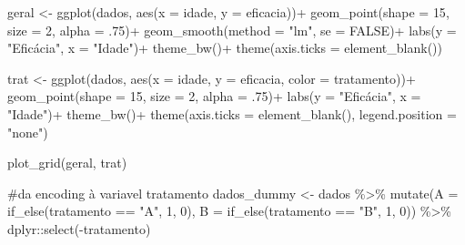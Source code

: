 \documentclass[
  letterpaper,
  DIV=11,
  numbers=noendperiod]{scrartcl}
\newenvironment{Shaded}{\begin{snugshade}}{\end{snugshade}}
\newcommand{\AttributeTok}[1]{\textcolor[rgb]{0.40,0.45,0.13}{#1}}
\newcommand{\CommentTok}[1]{\textcolor[rgb]{0.37,0.37,0.37}{#1}}
\newcommand{\ConstantTok}[1]{\textcolor[rgb]{0.56,0.35,0.01}{#1}}
\newcommand{\DecValTok}[1]{\textcolor[rgb]{0.68,0.00,0.00}{#1}}
\newcommand{\FunctionTok}[1]{\textcolor[rgb]{0.28,0.35,0.67}{#1}}
\newcommand{\NormalTok}[1]{\textcolor[rgb]{0.00,0.23,0.31}{#1}}
\newcommand{\OtherTok}[1]{\textcolor[rgb]{0.00,0.23,0.31}{#1}}
\newcommand{\SpecialCharTok}[1]{\textcolor[rgb]{0.37,0.37,0.37}{#1}}
\newcommand{\StringTok}[1]{\textcolor[rgb]{0.13,0.47,0.30}{#1}}
\begin{document}
\begin{Shaded}
\begin{Highlighting}[]
\NormalTok{geral }\OtherTok{\textless{}{-}} \FunctionTok{ggplot}\NormalTok{(dados, }\FunctionTok{aes}\NormalTok{(}\AttributeTok{x =}\NormalTok{ idade, }\AttributeTok{y =}\NormalTok{ eficacia))}\SpecialCharTok{+}
  \FunctionTok{geom\_point}\NormalTok{(}\AttributeTok{shape =} \DecValTok{15}\NormalTok{, }\AttributeTok{size =} \DecValTok{2}\NormalTok{, }\AttributeTok{alpha =}\NormalTok{ .}\DecValTok{75}\NormalTok{)}\SpecialCharTok{+}
  \FunctionTok{geom\_smooth}\NormalTok{(}\AttributeTok{method =} \StringTok{"lm"}\NormalTok{, }\AttributeTok{se =} \ConstantTok{FALSE}\NormalTok{)}\SpecialCharTok{+}
  \FunctionTok{labs}\NormalTok{(}\AttributeTok{y =} \StringTok{"Eficácia"}\NormalTok{, }\AttributeTok{x =} \StringTok{"Idade"}\NormalTok{)}\SpecialCharTok{+}
  \FunctionTok{theme\_bw}\NormalTok{()}\SpecialCharTok{+}
  \FunctionTok{theme}\NormalTok{(}\AttributeTok{axis.ticks =} \FunctionTok{element\_blank}\NormalTok{())}

\NormalTok{trat }\OtherTok{\textless{}{-}} \FunctionTok{ggplot}\NormalTok{(dados, }\FunctionTok{aes}\NormalTok{(}\AttributeTok{x =}\NormalTok{ idade, }\AttributeTok{y =}\NormalTok{ eficacia, }\AttributeTok{color =}\NormalTok{ tratamento))}\SpecialCharTok{+}
  \FunctionTok{geom\_point}\NormalTok{(}\AttributeTok{shape =} \DecValTok{15}\NormalTok{, }\AttributeTok{size =} \DecValTok{2}\NormalTok{, }\AttributeTok{alpha =}\NormalTok{ .}\DecValTok{75}\NormalTok{)}\SpecialCharTok{+}
  \FunctionTok{labs}\NormalTok{(}\AttributeTok{y =} \StringTok{"Eficácia"}\NormalTok{, }\AttributeTok{x =} \StringTok{"Idade"}\NormalTok{)}\SpecialCharTok{+}
  \FunctionTok{theme\_bw}\NormalTok{()}\SpecialCharTok{+}
  \FunctionTok{theme}\NormalTok{(}\AttributeTok{axis.ticks =} \FunctionTok{element\_blank}\NormalTok{(),}
        \AttributeTok{legend.position =} \StringTok{"none"}\NormalTok{)}

\FunctionTok{plot\_grid}\NormalTok{(geral, trat)}

\CommentTok{\#da encoding à variavel tratamento}
\NormalTok{dados\_dummy }\OtherTok{\textless{}{-}}\NormalTok{ dados }\SpecialCharTok{\%\textgreater{}\%}
  \FunctionTok{mutate}\NormalTok{(}\AttributeTok{A =} \FunctionTok{if\_else}\NormalTok{(tratamento }\SpecialCharTok{==} \StringTok{"A"}\NormalTok{, }\DecValTok{1}\NormalTok{, }\DecValTok{0}\NormalTok{),}
         \AttributeTok{B =} \FunctionTok{if\_else}\NormalTok{(tratamento }\SpecialCharTok{==} \StringTok{"B"}\NormalTok{, }\DecValTok{1}\NormalTok{, }\DecValTok{0}\NormalTok{)) }\SpecialCharTok{\%\textgreater{}\%}
\NormalTok{  dplyr}\SpecialCharTok{::}\FunctionTok{select}\NormalTok{(}\SpecialCharTok{{-}}\NormalTok{tratamento)}


\end{Highlighting}
\end{Shaded}
\end{document}
